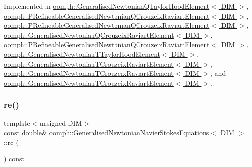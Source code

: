 Implemented in \hyperlink{classoomph_1_1GeneralisedNewtonianQTaylorHoodElement_a8eaa00a86146a184fc2fae213061f200}{oomph\+::\+Generalised\+Newtonian\+Q\+Taylor\+Hood\+Element$<$ D\+I\+M $>$}, \hyperlink{classoomph_1_1PRefineableGeneralisedNewtonianQCrouzeixRaviartElement_a6774455a8d434b26b49c0a4957afa604}{oomph\+::\+P\+Refineable\+Generalised\+Newtonian\+Q\+Crouzeix\+Raviart\+Element$<$ D\+I\+M $>$}, \hyperlink{classoomph_1_1PRefineableGeneralisedNewtonianQCrouzeixRaviartElement_a7d05683bf0896faeb1331a84b0add869}{oomph\+::\+P\+Refineable\+Generalised\+Newtonian\+Q\+Crouzeix\+Raviart\+Element$<$ D\+I\+M $>$}, \hyperlink{classoomph_1_1GeneralisedNewtonianQCrouzeixRaviartElement_aaf51b44d72cceba2115671c6d99cb38c}{oomph\+::\+Generalised\+Newtonian\+Q\+Crouzeix\+Raviart\+Element$<$ D\+I\+M $>$}, \hyperlink{classoomph_1_1PRefineableGeneralisedNewtonianQCrouzeixRaviartElement_a5abe327bf24e7d27f57d72522ea776b8}{oomph\+::\+P\+Refineable\+Generalised\+Newtonian\+Q\+Crouzeix\+Raviart\+Element$<$ D\+I\+M $>$}, \hyperlink{classoomph_1_1GeneralisedNewtonianTTaylorHoodElement_a28c35b910b1c8f01677a7102c83ed94e}{oomph\+::\+Generalised\+Newtonian\+T\+Taylor\+Hood\+Element$<$ D\+I\+M $>$}, \hyperlink{classoomph_1_1GeneralisedNewtonianTCrouzeixRaviartElement_a2fb667e5e88e526f2ff3fc9077488c2e}{oomph\+::\+Generalised\+Newtonian\+T\+Crouzeix\+Raviart\+Element$<$ D\+I\+M $>$}, \hyperlink{classoomph_1_1GeneralisedNewtonianTCrouzeixRaviartElement_a566a1f5f33884ebac7995fef3fca1ccd}{oomph\+::\+Generalised\+Newtonian\+T\+Crouzeix\+Raviart\+Element$<$ D\+I\+M $>$}, and \hyperlink{classoomph_1_1GeneralisedNewtonianTCrouzeixRaviartElement_aa63eaa8f55cb948e2916e869aa735a21}{oomph\+::\+Generalised\+Newtonian\+T\+Crouzeix\+Raviart\+Element$<$ D\+I\+M $>$}.

\mbox{\label{classoomph_1_1GeneralisedNewtonianNavierStokesEquations_af26fb6fab52a4b5ef06e8e595d07c09f}} 
\subsubsection{\texorpdfstring{re()}{re()}}
{\footnotesize\ttfamily template$<$unsigned D\+IM$>$ \\
const double\& \hyperlink{classoomph_1_1GeneralisedNewtonianNavierStokesEquations}{oomph\+::\+Generalised\+Newtonian\+Navier\+Stokes\+Equations}$<$ D\+IM $>$\+::re (\begin{DoxyParamCaption}{ }\end{DoxyParamCaption}) const\hspace{0.3cm}{\ttfamily [inline]}}



